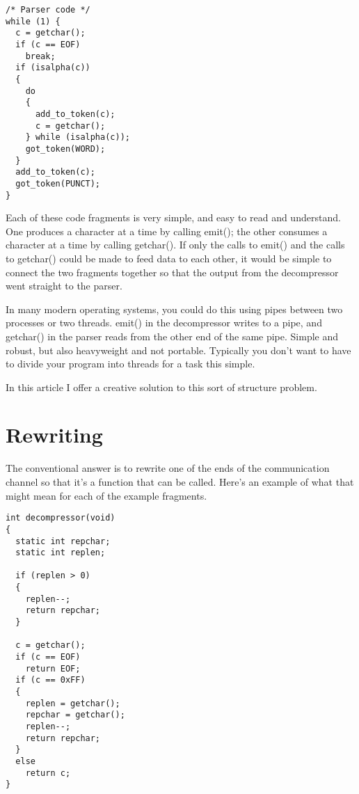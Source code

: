 \documentclass[12pt]{article}
\begin{document}
\begin{CJK}{UTF8}{bsmi}
\begin{multicols}{2}
\begin{lstlisting}[caption=parser, basicstyle=\footnotesize]
/* Parser code */
while (1) {
  c = getchar();
  if (c == EOF)
    break;
  if (isalpha(c)) 
  {
    do 
    {
      add_to_token(c);
      c = getchar();
    } while (isalpha(c));
    got_token(WORD);
  }
  add_to_token(c);
  got_token(PUNCT);
}

\end{lstlisting}
\end{multicols}

 Each of these code fragments is very simple, and easy to read and understand. One produces a character at a time by calling emit(); the other consumes a character at a time by calling getchar(). If only the calls to emit() and the calls to getchar() could be made to feed data to each other, it would be simple to connect the two fragments together so that the output from the decompressor went straight to the parser.

 In many modern operating systems, you could do this using pipes between two processes or two threads. emit() in the decompressor writes to a pipe, and getchar() in the parser reads from the other end of the same pipe. Simple and robust, but also heavyweight and not portable. Typically you don't want to have to divide your program into threads for a task this simple.

 In this article I offer a creative solution to this sort of structure problem. 


\section{Rewriting}
 The conventional answer is to rewrite one of the ends of the communication channel so that it's a function that can be called. Here's an example of what that might mean for each of the example fragments.

\newpage
\begin{multicols}{2}

\begin{lstlisting}[caption=decompression, basicstyle=\footnotesize]
int decompressor(void) 
{
  static int repchar;
  static int replen;

  if (replen > 0) 
  {
    replen--;
    return repchar;
  }

  c = getchar();
  if (c == EOF)
    return EOF;
  if (c == 0xFF) 
  {
    replen = getchar();
    repchar = getchar();
    replen--;
    return repchar;
  }
  else
    return c;
}
\end{lstlisting}


\end{multicols}
\end{CJK}
\end{document}
